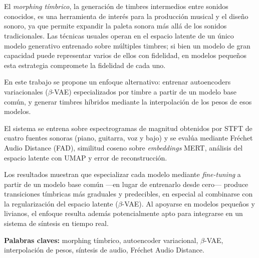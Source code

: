 \chapter*{\runtitulo}

\noindent El \emph{morphing tímbrico}, la generación de timbres intermedios
entre sonidos conocidos, es una herramienta de interés para la producción
musical y el diseño sonoro, ya que permite expandir la paleta sonora más allá
de los sonidos tradicionales. Las técnicas usuales operan en el
espacio latente de un único modelo generativo entrenado sobre múltiples
timbres; si bien un modelo de gran capacidad puede representar varios de
ellos con fidelidad, en modelos pequeños esta estrategia compromete la
fidelidad de cada uno.

En este trabajo se propone un enfoque alternativo: entrenar autoencoders
variacionales ($\beta$-VAE) especializados por timbre a partir de un
modelo base común, y generar timbres híbridos mediante la interpolación
de los pesos de esos modelos.

El sistema se entrena sobre espectrogramas de magnitud obtenidos por STFT
de cuatro fuentes sonoras (piano, guitarra, voz y bajo) y se evalúa mediante
Fréchet Audio Distance (FAD), similitud coseno sobre \emph{embeddings} MERT,
análisis del espacio latente con UMAP y error de reconstrucción.

Los resultados muestran que especializar cada modelo mediante \emph{fine-tuning}
a partir de un modelo base común —en lugar de entrenarlo desde cero— produce
transiciones tímbricas más graduales y predecibles, en especial al combinarse
con la regularización del espacio latente ($\beta$-VAE). Al apoyarse en modelos
pequeños y livianos, el enfoque resulta además potencialmente apto para
integrarse en un sistema de síntesis en tiempo real.

\bigskip

\noindent\textbf{Palabras claves:} morphing tímbrico, autoencoder variacional,
$\beta$-VAE, interpolación de pesos, síntesis de audio, Fréchet Audio
Distance.
